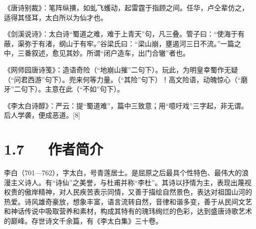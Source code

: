 \documentclass[letterpaper,10pt,english]{sphinxmanual}
\begin{document}
《唐诗别裁》：笔阵纵撗，如虬飞蠖动，起雷霆于指顾之间。任华，卢仝辈仿之，适得其怪耳，太白所以为仙才也。

《剑溪说诗》：太白诗“蜀道之难，难于上青天”句，凡三叠。管子曰：“使海于有蔽，渠弥于有渚，纲山于有牢。”谷梁氏曰：“梁山崩，壅遏河三日不流。”一篇之中，三番叙述，愈见其妙。所谓“闭户造车，出门合辙”者也。

《网师园唐诗笺》：造语奇险（“地崩山摧”二句下）。玩此，为明皇幸蜀作无疑（“问君西游”句下）。兜来何等力量。（“其险”句下）！高文险语，动魄惊心（“磨牙”二句下）。主意在此（“不如”句下）。

《李太白诗醇》：严云：提“蜀道难”，篇中三致意；用“噫吁戏”三字起，非无谓。后人学袭，便成恶道。{[}8{]}


\section{1.7   作者简介}
\label{\detokenize{p01_u6563_u6587/_u674e_u767d-_u8700_u9053_u96be:id9}}
李白（701—762），字太白，号青莲居士。是屈原之后最具个性特色、最伟大的浪漫主义诗人。有“诗仙”之美誉，与杜甫并称“李杜”。其诗以抒情为主，表现出蔑视权贵的傲岸精神，对人民疾苦表示同情，又善于描绘自然景色，表达对祖国山河的热爱。诗风雄奇豪放，想象丰富，语言流转自然，音律和谐多变，善于从民间文艺和神话传说中吸取营养和素材，构成其特有的瑰玮绚烂的色彩，达到盛唐诗歌艺术的巅峰。存世诗文千余篇，有《李太白集》三十卷。
\end{document}

